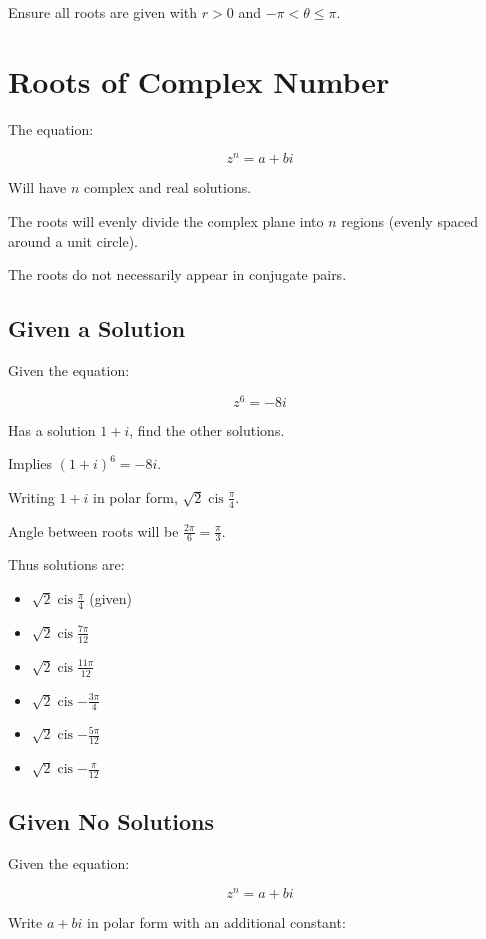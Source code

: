 \documentclass[a4paper,11pt]{article}
\DeclareMathOperator\cis{cis}
\begin{document}
Ensure all roots are given with $r > 0$ and $-\pi < \theta \leq \pi$.




\section{Roots of Complex Number}

The equation:

$$
z^n = a + bi
$$

Will have $n$ complex and real solutions.

The roots will evenly divide the complex plane into $n$ regions (evenly spaced
around a unit circle).

The roots do not necessarily appear in conjugate pairs.


\subsection{Given a Solution}

Given the equation:

$$
z^6 = -8i
$$

Has a solution $1 + i$, find the other solutions.

Implies $(1 + i)^6 = -8i$.

Writing $1 + i$ in polar form, $\sqrt{2} \cis{\frac{\pi}{4}}$.

Angle between roots will be $\frac{2\pi}{6} = \frac{\pi}{3}$.

Thus solutions are:

\begin{itemize}
\item $\sqrt{2} \cis{\frac{\pi}{4}}$ (given)
\item $\sqrt{2} \cis{\frac{7\pi}{12}}$
\item $\sqrt{2} \cis{\frac{11\pi}{12}}$
\item $\sqrt{2} \cis{-\frac{3\pi}{4}}$
\item $\sqrt{2} \cis{-\frac{5\pi}{12}}$
\item $\sqrt{2} \cis{-\frac{\pi}{12}}$
\end{itemize}


\subsection{Given No Solutions}

Given the equation:

$$
z^n = a + bi
$$

Write $a + bi$ in polar form with an additional constant:
\end{document}
